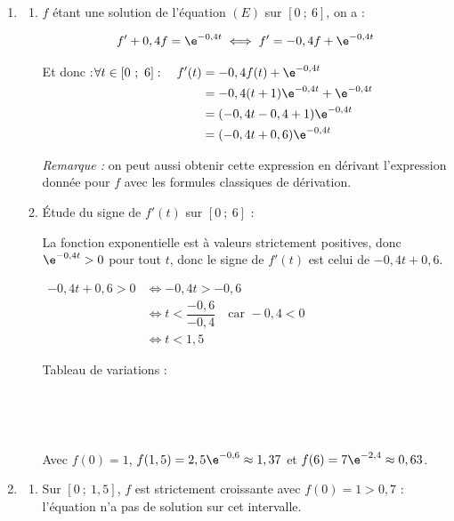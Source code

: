 \begin{enumerate}
\item
	\begin{enumerate}
		\item $f$ étant une solution de l'équation $(E)$ sur $[0~;~6]$, on a :

\[f' + 0,4f = \e^{-0,4t} \iff f' = -0,4f + \e^{-0,4t}\]

Et donc :\quad $\forall t \in [0~;~6] :\quad \begin{aligned}[t]
f'(t) &= -0,4f(t) + \e^{-0,4t}\\
	&= - 0,4(t+ 1)\e^{-0,4t} + \e^{-0,4t}\\
	&= (- 0,4t - 0,4 + 1)\e^{-0,4t}\\
	&= (-0,4t + 0,6)\e^{-0,4t}
\end{aligned}$

\emph{Remarque :} on peut aussi obtenir cette expression en dérivant l'expression donnée pour $f$ avec les formules classiques de dérivation.

\item Étude du signe de $f'(t)$ sur $[0~;~6]$ :

La fonction exponentielle est à valeurs strictement positives, donc $\e^{-0,4t} > 0$ pour tout $t$, donc le signe de $f'(t)$ est celui de $-0,4t + 0,6$.

$\begin{aligned}
-0,4t + 0,6 > 0 &\iff -0,4 t > -0,6\\
	&\iff t < \dfrac{-0,6}{-0,4 }\quad \text{car }-0,4 <0\\
	&\iff t < 1,5
\end{aligned}$

Tableau de variations :

\hfill~\hfill~

Avec $f(0) = 1$,\: $f(1,5) = 2,5\e^{-0,6} \approx 1,37$ et $f(6) = 7\e^{-2,4} \approx 0,63$.
\end{enumerate}

\item
	\begin{enumerate}
		\item Sur $[0~;~1,5]$, $f$ est strictement croissante avec $f(0) = 1 > 0,7$ : l'équation n'a pas de solution sur cet intervalle.


\end{enumerate}
\end{enumerate}
